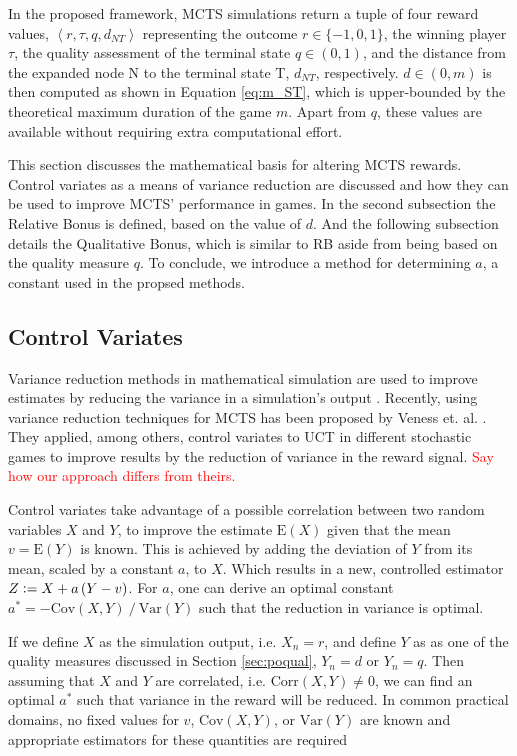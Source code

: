 \documentclass{ecai2014}
\newcommand\todo[1]{\textcolor{red}{#1}}
\newcommand{\tuple}[1]{\ensuremath{\left \langle #1 \right \rangle }}
\newcommand{\node}[1]{{\fontfamily{phv}\selectfont#1}}
\newcommand{\E}[1]{\mathrm{E}\left( #1 \right)}
\newcommand{\Var}[1]{\mathrm{Var}\left( #1 \right)}
\newcommand{\Cov}[1]{\mathrm{Cov}\left( #1 \right)}
\newcommand{\Corr}[1]{\mathrm{Corr}\left( #1 \right)}
\newcommand{\defeq}{\vcentcolon=}
\begin{document}
In the proposed framework, MCTS simulations return a tuple of four reward values, $\tuple{r,\tau,q,d_{NT}}$ representing the outcome $r\in\{-1, 0, 1\}$, the winning player $\tau$, the quality assessment of the terminal state $q\in(0, 1)$, and the distance from the expanded node \node{N} to the terminal state \node{T}, $d_{NT}$, respectively. $d\in(0, m)$ is then computed as shown in Equation \ref{eq:m_ST}, which is upper-bounded by the theoretical maximum duration of the game $m$. Apart from $q$, these values are available without requiring extra computational effort.

This section discusses the mathematical basis for altering MCTS rewards. Control variates as a means of variance reduction are discussed and how they can be used to improve MCTS' performance in games. In the second subsection the Relative Bonus is defined, based on the value of $d$. And the following subsection details the Qualitative Bonus, which is similar to RB aside from being based on the quality measure $q$. To conclude, we introduce a method for determining $a$, a constant used in the propsed methods.

\subsection{Control Variates}
Variance reduction methods in mathematical simulation are used to improve estimates by reducing the variance in a simulation's output \cite{kelton2000simulation}. Recently, using variance reduction techniques for MCTS has been proposed by Veness et. al. \cite{Veness11variance}. They applied, among others, control variates to UCT in different stochastic games to improve results by the reduction of variance in the reward signal. \todo{Say how our approach differs from theirs.}

Control variates take advantage of a possible correlation between two random variables $X$ and $Y$, to improve the estimate $\E{X}$ given that the mean $v=\E{Y}$ is known. This is achieved by adding the deviation of $Y$ from its mean, scaled by a constant $a$, to $X$. Which results in a new, controlled estimator $Z\defeq X+a\left(Y-v\right)$. For $a$, one can derive an optimal constant $a^*=-\Cov{X,Y}\mathbin{/}\Var{Y}$ such that the reduction in variance is optimal.

If we define $X$ as the simulation output, i.e. $X_n=r$, and define $Y$ as as one of the quality measures discussed in Section \ref{sec:poqual}, $Y_n=d$ or $Y_n=q$. Then assuming that $X$ and $Y$ are correlated, i.e. $\Corr{X,Y}\neq0$, we can find an optimal $a^*$ such that variance in the reward will be reduced. In common practical domains, no fixed values for $v$, $\Cov{X,Y}$, or $\Var{Y}$ are known and appropriate estimators for these quantities are required
\end{document}
